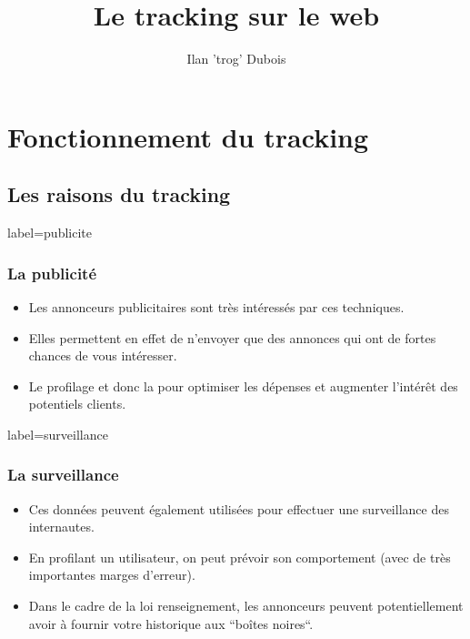 \documentclass{beamer}
\title{Le tracking sur le web}
\author{Ilan 'trog' Dubois}
\begin{document}
    \begin{frame}
        \titlepage
    \end{frame}
    \section{Fonctionnement du tracking}
    \subsection{Les raisons du tracking}
        \begin{frame}{label=publicite}
            \frametitle{La publicité}
            \begin{center}
                \begin{itemize}
                    \item Les annonceurs publicitaires sont très intéressés par ces techniques.
                    \pause
                    \item Elles permettent en effet de n'envoyer que des annonces qui ont de fortes chances de vous intéresser.
                    \pause
                    \item Le profilage et donc la pour optimiser les dépenses et augmenter l'intérêt des potentiels clients.
                \end{itemize}
            \end{center}
        \end{frame}
        \begin{frame}{label=surveillance}
            \frametitle{La surveillance}
            \begin{center}
                \begin{itemize}
                    \item Ces données peuvent également utilisées pour effectuer une surveillance des internautes.
                    \pause
                    \item En profilant un utilisateur, on peut prévoir son comportement (avec de très importantes marges d'erreur).
                    \pause
                    \item Dans le cadre de la loi renseignement, les annonceurs peuvent potentiellement avoir à fournir votre historique aux ``boîtes noires``.
                \end{itemize}
            \end{center}
        \end{frame}
\end{document}

